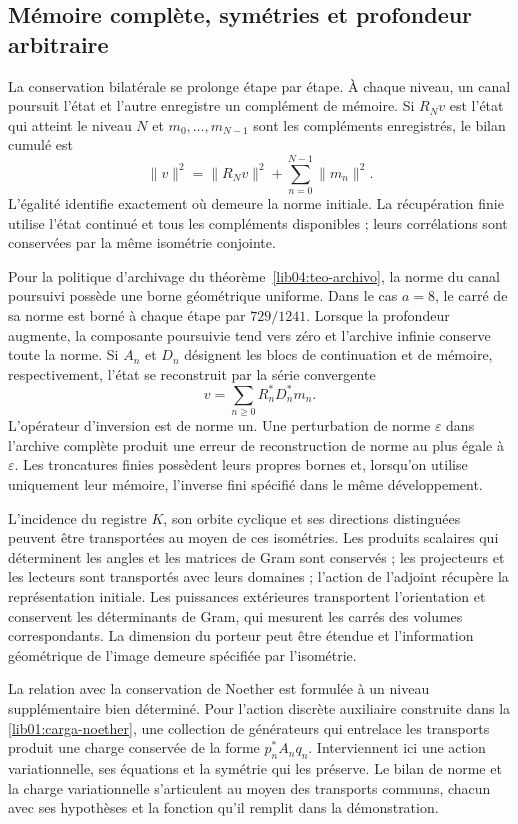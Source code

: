 \subsection*{Mémoire complète, symétries et profondeur arbitraire}
\label{libnar:memoria}

La conservation bilatérale se prolonge étape par étape. À chaque niveau, un canal poursuit l'état et l'autre enregistre un complément de mémoire. Si \(R_Nv\) est l'état qui atteint le niveau \(N\) et \(m_0,\ldots,m_{N-1}\) sont les compléments enregistrés, le bilan cumulé est
\[
 \|v\|^2=\|R_Nv\|^2+\sum_{n=0}^{N-1}\|m_n\|^2.
\]
L’égalité identifie exactement où demeure la norme
initiale. La récupération finie utilise l’état continué et
tous les compléments disponibles ; leurs corrélations sont conservées
par la même isométrie conjointe.

Pour la politique d'archivage du théorème~\ref{lib04:teo-archivo}, la norme du canal poursuivi possède une borne géométrique uniforme. Dans le cas \(a=8\), le carré de sa norme est borné à chaque étape par \(729/1241\). Lorsque la profondeur augmente, la composante poursuivie tend vers zéro et l'archive infinie conserve toute la norme. Si \(A_n\) et \(D_n\) désignent les blocs de continuation et de mémoire, respectivement, l'état se reconstruit par la série convergente
\[
 v=\sum_{n\geq0}R_n^*D_n^*m_n.
\]
L’opérateur d’inversion est de norme un. Une perturbation de norme
\(\varepsilon\) dans l’archive complète produit une erreur de
reconstruction de norme au plus égale à \(\varepsilon\). Les
troncatures finies possèdent leurs propres bornes et, lorsqu’on utilise
uniquement leur mémoire, l’inverse fini spécifié dans le même
développement.

L’incidence du registre \(K\), son orbite cyclique et ses
directions distinguées peuvent être transportées au moyen de ces
isométries. Les produits scalaires qui déterminent
les angles et les matrices de Gram sont conservés ; les projecteurs et les lecteurs sont
transportés avec leurs domaines ; l’action de l’adjoint récupère la
représentation initiale. Les puissances extérieures transportent
l’orientation et conservent les déterminants de Gram, qui mesurent les
carrés des volumes correspondants. La dimension du
porteur peut être étendue et l’information géométrique de
l’image demeure spécifiée par l’isométrie.

La relation avec la conservation de Noether est formulée à un niveau
supplémentaire bien déterminé. Pour l’action discrète auxiliaire
construite dans la \cref{lib01:carga-noether}, une collection de
générateurs qui entrelace les transports produit une charge
conservée de la forme \(p_n^*A_nq_n\). Interviennent ici une
action variationnelle, ses équations et la symétrie qui les préserve.
Le bilan de norme et la charge variationnelle s’articulent au moyen
des transports communs, chacun avec ses hypothèses et la
fonction qu’il remplit dans la démonstration.

